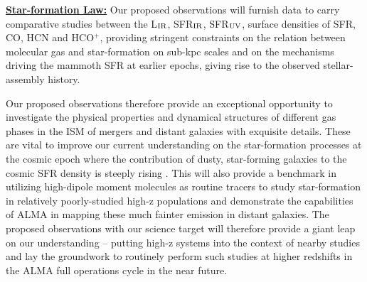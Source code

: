 \documentclass[12pt,a4paper]{article}  %
\newcommand{\LIR}{\mbox{L$_{\rm IR}$}\xspace}
\newcommand{\hcop}{HCO$^+$\xspace}
\begin{document}
\underline{\bf Star-formation Law:}
Our proposed observations will furnish data to carry comparative studies
between the \LIR, SFR$_{\rm IR}$, SFR$_{\rm UV}$, surface densities of SFR, CO, HCN and \hcop,
providing stringent constraints on the relation between molecular gas and star-formation on sub-kpc scales and on the mechanisms driving the mammoth SFR at earlier epochs, giving rise to the observed stellar-assembly history.

\par 
Our proposed observations therefore provide an exceptional opportunity to investigate
the physical properties and dynamical structures of different gas phases in the ISM of mergers 
and distant galaxies with exquisite details.
These are vital to improve our current understanding 
on the star-formation processes at the cosmic epoch 
where the contribution of dusty, star-forming galaxies to the cosmic SFR density is steeply rising 
\citep{LeFloch05a}. 
This will also provide a benchmark in utilizing high-dipole moment molecules as 
routine tracers to study star-formation in relatively poorly-studied high-z populations
and demonstrate the capabilities of ALMA in mapping these much fainter emission in distant galaxies.
 The proposed observations with our science target will therefore provide a giant leap on 
our understanding -- putting high-z systems into the context of nearby studies and lay the groundwork to 
routinely perform such studies at higher redshifts in the ALMA full operations cycle in the near future.
\end{document}
